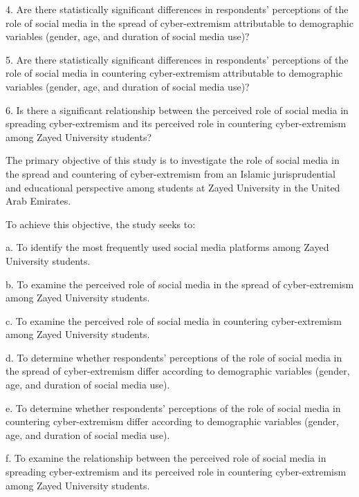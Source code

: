 \documentclass[10pt]{NSP1}
\begin{document}
4. Are there statistically significant differences in respondents' perceptions of the role of social media in the spread of cyber-extremism attributable to demographic variables (gender, age, and duration of social media use)?

5. Are there statistically significant differences in respondents' perceptions of the role of social media in countering cyber-extremism attributable to demographic variables (gender, age, and duration of social media use)?

6. Is there a significant relationship between the perceived role of social media in spreading cyber-extremism and its perceived role in countering cyber-extremism among Zayed University students?

\par\medskip{}\smallskip

The primary objective of this study is to investigate the role of social media in the spread and countering of cyber-extremism from an Islamic jurisprudential and educational perspective among students at Zayed University in the United Arab Emirates.

To achieve this objective, the study seeks to:

a. To identify the most frequently used social media platforms among Zayed University students.

b. To examine the perceived role of social media in the spread of cyber-extremism among Zayed University students.

c. To examine the perceived role of social media in countering cyber-extremism among Zayed University students.

d. To determine whether respondents' perceptions of the role of social media in the spread of cyber-extremism differ according to demographic variables (gender, age, and duration of social media use).

e. To determine whether respondents' perceptions of the role of social media in countering cyber-extremism differ according to demographic variables (gender, age, and duration of social media use).

f. To examine the relationship between the perceived role of social media in spreading cyber-extremism and its perceived role in countering cyber-extremism among Zayed University students.

\par\medskip{}\smallskip
\end{document}
